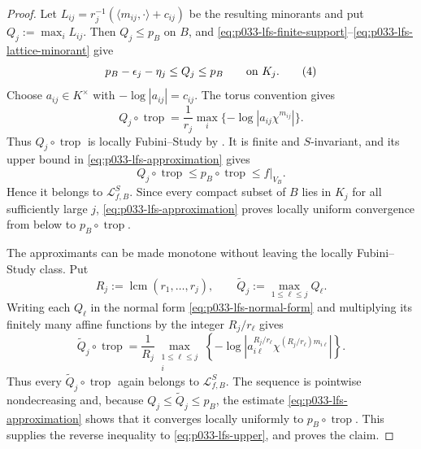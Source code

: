 \begin{proof}
Let \(L_{ij}=r_j^{-1}(\langle m_{ij},\cdot\rangle+c_{ij})\) be the resulting
minorants and put \(Q_j:=\max_iL_{ij}\).  Then \(Q_j\leq p_B\) on \(B\), and
\eqref{eq:p033-lfs-finite-support}--\eqref{eq:p033-lfs-lattice-minorant} give
\[
 p_B-\epsilon_j-\eta_j\leq Q_j\leq p_B
 \qquad\hbox{on }K_j.
\tag{4}\label{eq:p033-lfs-approximation}
\]
Choose \(a_{ij}\in K^\times\) with
\(-\log|a_{ij}|=c_{ij}\).  The torus convention gives
\[
 Q_j\circ\operatorname{trop}
 =\frac1{r_j}\max_i\{-\log|a_{ij}\chi^{m_{ij}}|\}.
\tag{5}\label{eq:p033-lfs-normal-form}
\]
Thus \(Q_j\circ\operatorname{trop}\) is locally Fubini--Study by
\cite[\S7.9]{GJR26}.  It is finite and \(S\)-invariant, and its upper bound
in \eqref{eq:p033-lfs-approximation} gives
\[
 Q_j\circ\operatorname{trop}
 \leq p_B\circ\operatorname{trop}
 \leq f|_{V_B}.
\]
Hence it belongs to \(\mathcal L^S_{f,B}\).  Since every compact subset of
\(B\) lies in \(K_j\) for all sufficiently large \(j\),
\eqref{eq:p033-lfs-approximation} proves locally uniform convergence from
below to \(p_B\circ\operatorname{trop}\).

The approximants can be made monotone without leaving the locally
Fubini--Study class.  Put
\[
                       R_j:=\operatorname{lcm}(r_1,\ldots,r_j),
 \qquad \widetilde Q_j:=\max_{1\leq\ell\leq j}Q_\ell .
\]
Writing each $Q_\ell$ in the normal form
\eqref{eq:p033-lfs-normal-form} and multiplying its finitely many affine
functions by the integer $R_j/r_\ell$ gives
\[
 \widetilde Q_j\circ\operatorname{trop}
 =\frac1{R_j}\max_{\substack{1\leq\ell\leq j\\ i}}
 \left\{-\log\left|a_{i\ell}^{R_j/r_\ell}
       \chi^{(R_j/r_\ell)m_{i\ell}}\right|\right\}.
\tag{6}\label{eq:p033-lfs-monotone-normal-form}
\]
Thus every \(\widetilde Q_j\circ\operatorname{trop}\) again belongs to
\(\mathcal L^S_{f,B}\).  The sequence is pointwise nondecreasing and,
because \(Q_j\leq\widetilde Q_j\leq p_B\), the estimate
\eqref{eq:p033-lfs-approximation} shows that it converges locally uniformly
to \(p_B\circ\operatorname{trop}\).  This supplies the reverse inequality
to \eqref{eq:p033-lfs-upper}, and proves the claim.
\end{proof}
